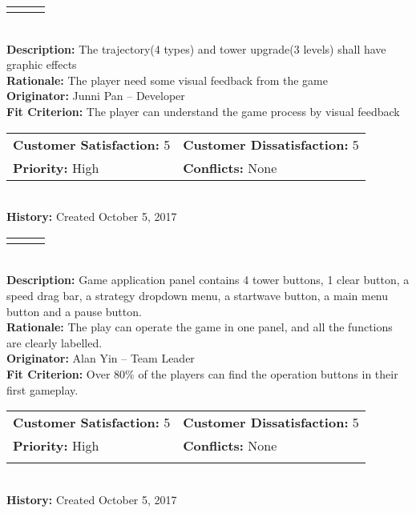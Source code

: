 \documentclass[12pt]{article}
\begin{document}
\begin{reqbox}
\begin{tabular}{ccc}\color{red}{Requirement: FR03}
\end{tabular} \\
\textbf{Description:} The trajectory(4 types) and tower upgrade(3 levels) shall have graphic effects\\
\textbf{Rationale:} The player need some visual feedback from the game\\
\textbf{Originator:} Junni Pan -- Developer \\
\textbf{Fit Criterion:} The player can understand the game process by visual feedback\\
\begin{tabular}{ll}
\textbf{Customer Satisfaction:} 5 & \textbf{Customer Dissatisfaction:} 5 \\
\textbf{Priority:} High & \textbf{Conflicts:} None\\
\end{tabular} \\
\textbf{History:} Created October 5, 2017
\end{reqbox}


\begin{reqbox}
\begin{tabular}{ccc}\color{red}{Requirement: FR04}
\end{tabular} \\
\color{red}
\textbf{Description:} Game application panel contains 4 tower buttons, 1 clear button, a speed drag bar, a strategy dropdown menu, a startwave button, a main menu button and a pause button.\\
\textbf{Rationale:} The play can operate the game in one panel, and all the functions are clearly labelled.\\
\textbf{Originator:} Alan Yin -- Team Leader \\
\textbf{Fit Criterion:} Over 80\% of the players can find the operation buttons in their first gameplay.\\
\begin{tabular}{ll}
\textbf{Customer Satisfaction:} 5 & \textbf{Customer Dissatisfaction:} 5 \\
\textbf{Priority:} High & \textbf{Conflicts:} None\\
\color{black}
\end{tabular} \\
\textbf{History:} Created October 5, 2017
\end{reqbox}
\end{document}
